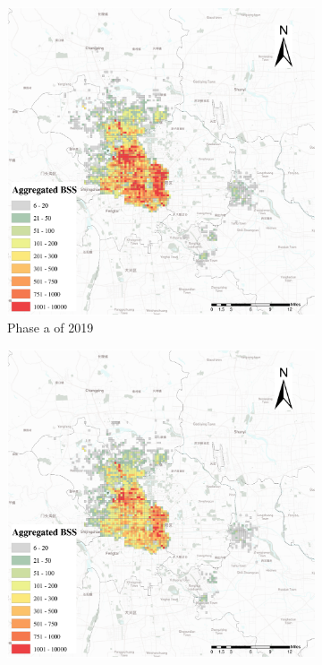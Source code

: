 \documentclass[preprints,ijgi,submit,moreauthors]{Definitions/mdpi}
\begin{document}
\begin{figure}[H]
    \vspace{6pt}
    \begin{subfigure}{.3\textwidth}
        \includegraphics[width=\textwidth]{Figures/BSSPhase1_2019.eps}
        \caption{Phase a of 2019}
    \end{subfigure}
    \begin{subfigure}{.3\textwidth}
        \includegraphics[width=\textwidth]{Figures/BSSPhase2_2019.eps}

\end{subfigure}
\end{figure}
\end{document}
